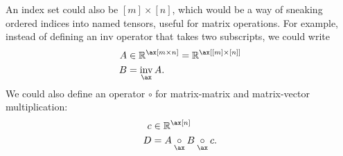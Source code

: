 An index set could also be $[m] \times [n]$, which would be a way of sneaking ordered indices into named tensors, useful for matrix operations. For example, instead of defining an $\text{inv}$ operator that takes two subscripts, we could write
\begin{align*}
  A &\in \mathbb{R}^{\ax[m \times n]} = \mathbb{R}^{\ax[[m] \times [n]]} \\
  B &= \nfun{\ax}{inv} A.
\end{align*}
We could also define an operator $\circ$ for matrix-matrix and matrix-vector multiplication:
\begin{align*}
  c &\in \mathbb{R}^{\ax[n]} \\
  D &= A \nbin{\ax}{\circ} B \nbin{\ax}{\circ} c.
\end{align*}
